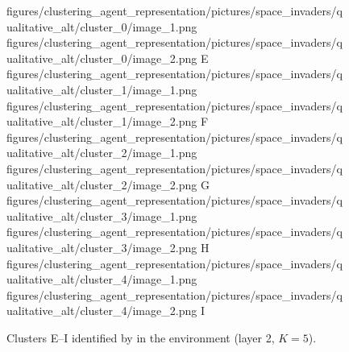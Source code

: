 \begin{figure}[H]
    \qualitativeClusterFigureSetup
    \qualitativeClusterTwo
        {figures/clustering_agent_representation/pictures/space_invaders/qualitative_alt/cluster_0/image_1.png}
        {figures/clustering_agent_representation/pictures/space_invaders/qualitative_alt/cluster_0/image_2.png}
        {E}
    \qualitativeClusterTwo
        {figures/clustering_agent_representation/pictures/space_invaders/qualitative_alt/cluster_1/image_1.png}
        {figures/clustering_agent_representation/pictures/space_invaders/qualitative_alt/cluster_1/image_2.png}
        {F}
    \qualitativeClusterTwo
        {figures/clustering_agent_representation/pictures/space_invaders/qualitative_alt/cluster_2/image_1.png}
        {figures/clustering_agent_representation/pictures/space_invaders/qualitative_alt/cluster_2/image_2.png}
        {G}
    \qualitativeClusterTwo
        {figures/clustering_agent_representation/pictures/space_invaders/qualitative_alt/cluster_3/image_1.png}
        {figures/clustering_agent_representation/pictures/space_invaders/qualitative_alt/cluster_3/image_2.png}
        {H}
    \qualitativeClusterTwo
        {figures/clustering_agent_representation/pictures/space_invaders/qualitative_alt/cluster_4/image_1.png}
        {figures/clustering_agent_representation/pictures/space_invaders/qualitative_alt/cluster_4/image_2.png}
        {I}
    \caption{Clusters E--I identified by  in the \SpaceInvadersName environment (layer 2, $K=5$).}
    \label{fig:qualitative_space_invaders_alt}
\end{figure}
